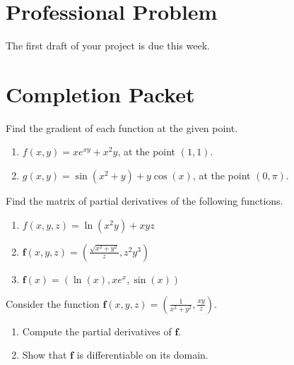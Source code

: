 \documentclass{ximera}
\begin{document}
\section*{Professional Problem}

\begin{problem} The first draft of your project is due this week.
\end{problem}

\section*{Completion Packet}

\begin{problem}

Find the gradient of each function at the given point.

\begin{enumerate}

\item $f(x,y) = xe^{xy}+x^2y$, at the point $(1,1)$.

\item $g(x,y) = \sin(x^2+y)+y\cos(x)$, at the point $(0, \pi)$.

\end{enumerate}
\end{problem}

\begin{problem}
Find the matrix of partial derivatives of the following functions.

\begin{enumerate}

\item $f(x,y,z) = \ln(x^2y) + xyz$

\item $\mathbf{f}(x,y,z) = \left(\frac{\sqrt{x^2+y^2}}{z}, z^2y^3\right)$

\item $\mathbf{f}(x) = (\ln(x), xe^x, \sin(x))$

\end{enumerate}
\end{problem}

\begin{problem}
 Consider the function $\mathbf{f}(x,y,z) = \left(\frac{1}{x^2+y^2}, \frac{xy}{z}\right)$. \begin{enumerate}
\item Compute the partial derivatives of $\mathbf{f}$.
\item Show that $\mathbf{f}$ is differentiable on its domain.
\end{enumerate}
\end{problem}
\end{document}
